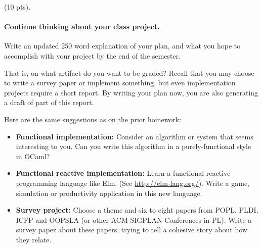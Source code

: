 \documentclass[11pt]{article}
\newcounter{taskcounter}
\newcounter{taskPercentCounter}
\newcommand{\task}[1]
  {\bigskip \noindent {\bf Task\addtocounter{taskPercentCounter}{#1} \arabic{taskcounter}\addtocounter{taskcounter}{1}} (#1 pts).}
\begin{document}
\task{10} \paragraph{Continue thinking about your class project.}
%
Write an updated 250 word explanation of your plan, and what you hope
to accomplish with your project by the end of the semester.

That is, on what artifact do you want to be graded?  Recall that you
may choose to write a survey paper or implement something, but even
implementation projects require a short report.  By writing your plan
now, you are also generating a draft of part of this report.

Here are the same suggestions as on the prior homework:
\begin{itemize}
\item \textbf{Functional implementation:}
  Consider an algorithm or system that seems interesting to you.
  Can you write this algorithm in a purely-functional style in OCaml?
\item \textbf{Functional reactive implementation:} Learn a functional
  reactive programming language like Elm. (See
  \url{http://elm-lang.org/}). Write a game, simulation or
  productivity application in this new language.
\item \textbf{Survey project:} Choose a theme and six to eight papers
  from POPL, PLDI, ICFP and OOPSLA (or other ACM SIGPLAN Conferences
  in PL).  Write a survey paper about these papers, trying to tell a
  cohesive story about how they relate.
\end{itemize}
\end{document}
